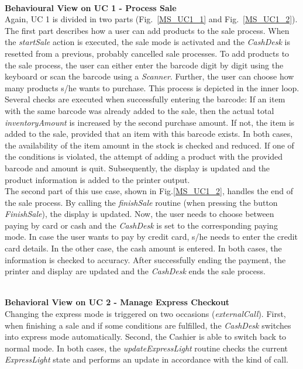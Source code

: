 		\noindent
		\\
		\textbf{Behavioural View on UC 1 - Process Sale} \\
		Again, UC 1 is divided in two parts (Fig.~\ref{MS_UC1_1} and Fig.~\ref{MS_UC1_2}).
		The first part describes how a user can add products to the sale process. When the \textit{startSale} action is executed, the sale mode is activated and the \textit{CashDesk} is resetted from a previous, probably cancelled sale processes. To add products to the sale process, the user can either enter the barcode digit by digit using the keyboard or scan the barcode using a \textit{Scanner}. Further, the user can choose how many products s/he wants to purchase. This process is depicted in the inner loop. 
		\\
		Several checks are executed when successfully entering the barcode: If an item with the same barcode was already added to the sale, then the actual total \textit{inventoryAmount}  is increased by the second purchase amount. If not, the item is added to the sale, provided that an item with this barcode exists. In both cases, the availability of the item amount in the stock is checked and reduced. If one of the conditions is violated, the attempt of adding a product with the provided barcode and amount is quit. 
		Subsequently, the display is updated and the product information is added to the printer output.
		\\
		The second part of this use case, shown in Fig.\ref{MS_UC1_2}, handles the end of the sale process. By calling the \textit{finishSale} routine (when pressing the button \textit{FinishSale}), the display is updated. Now, the user needs to choose between paying by card or cash and the \textit{CashDesk} is set to the corresponding paying mode. In case the user wants to pay by credit card, s/he needs to enter the credit card details. In the other case, the cash amount is entered. In both cases, the information is checked to accuracy.
		After successfully ending the payment, the printer and display are updated and the \textit{CashDesk} ends the sale process.

		\noindent
		\\
		\textbf{Behavioral View on UC 2 - Manage Express Checkout} \\
		Changing the express mode is triggered on two occasions (\textit{externalCall}). First, when finishing a sale and if some conditions are fulfilled, the \textit{CashDesk} switches into express mode automatically. Second, the Cashier is able to switch back to normal mode. In both cases, the \textit{updateExpressLight} routine checks the current \textit{ExpressLight} state and performs an update in accordance with the kind of call.
		
